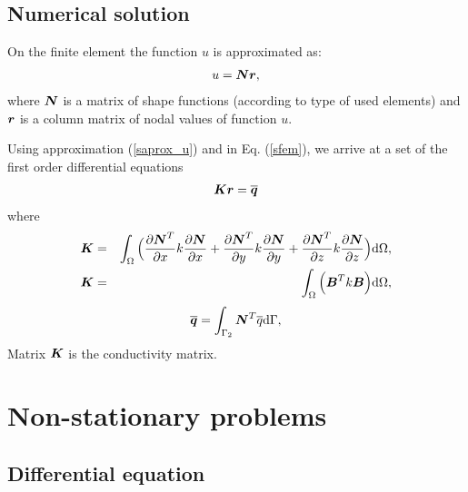 \subsection{Numerical solution}

On the finite element  the function $u$ is approximated as:
\begin{eqnarray}\label{saprox_u}
u = \mbox{\boldmath$Nr$},
\end{eqnarray}
where $\mbox{\boldmath$N$}$ is a matrix of shape  functions (according to type of used elements) 
and $\mbox{\boldmath$r$}$ is a column matrix of nodal values of function $u$.

Using approximation (\ref{saprox_u}) and in Eq. (\ref{sfem}), 
we arrive at a set of the first order differential equations
\begin{eqnarray}\label{sfemmatr}
\mbox{\boldmath$Kr$}  = \overline{\mbox{\boldmath$q$}}
\end{eqnarray}
where
\begin{eqnarray}\label{skint}
\mbox{\boldmath$K$} &=& \int_{\Omega}  \Big(\frac{\partial \mbox{\boldmath$N$}^T}{\partial x}k\frac{\partial \mbox{\boldmath$N$}}{\partial x} 
+ \frac{\partial \mbox{\boldmath$N$}^T}{\partial y}k\frac{\partial \mbox{\boldmath$N$}}{\partial y} + 
\frac{\partial \mbox{\boldmath$N$}^T}{\partial z}k\frac{\partial \mbox{\boldmath$N$}}{\partial z}\Big){\rm d}\Omega,\nonumber\\
\mbox{\boldmath$K$} &=& \int_{\Omega}  \Big(\mbox{\boldmath$B$}^T k \mbox{\boldmath$B$}\Big){\rm d}\Omega,
\end{eqnarray}
\begin{eqnarray}
\overline{\mbox{\boldmath$q$}} = \int_{\Gamma_2} \mbox{\boldmath$N$}^T  \overline{q}{\rm d}\Gamma,
\end{eqnarray}
Matrix $\mbox{\boldmath$K$}$ is the conductivity matrix.

\section{Non-stationary problems}
\label{secnonstationary}

\subsection{Differential equation}

